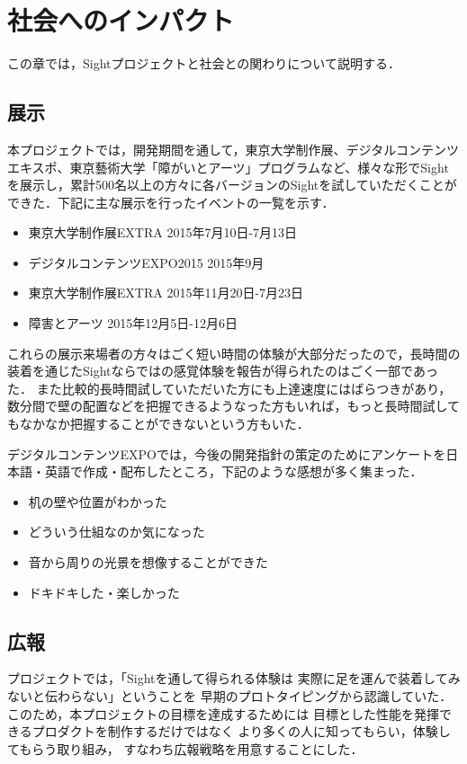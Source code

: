 \section{社会へのインパクト}

この章では，Sightプロジェクトと社会との関わりについて説明する．


\subsection{展示}

本プロジェクトでは，開発期間を通して，東京大学制作展、デジタルコンテンツエキスポ、東京藝術大学「障がいとアーツ」プログラムなど、様々な形でSightを展示し，累計500名以上の方々に各バージョンのSightを試していただくことができた．下記に主な展示を行ったイベントの一覧を示す．

\begin{itemize}
 \item 東京大学制作展EXTRA 2015年7月10日-7月13日
 \item デジタルコンテンツEXPO2015 2015年9月
 \item 東京大学制作展EXTRA 2015年11月20日-7月23日
 \item 障害とアーツ 2015年12月5日-12月6日
\end{itemize}

これらの展示来場者の方々はごく短い時間の体験が大部分だったので，長時間の装着を通じたSightならではの感覚体験を報告が得られたのはごく一部であった．
また比較的長時間試していただいた方にも上達速度にはばらつきがあり，
数分間で壁の配置などを把握できるようなった方もいれば，もっと長時間試してもなかなか把握することができないという方もいた．

デジタルコンテンツEXPOでは，今後の開発指針の策定のためにアンケートを日本語・英語で作成・配布したところ，下記のような感想が多く集まった．

\begin{itemize}
 \item 机の壁や位置がわかった
 \item どういう仕組なのか気になった
 \item 音から周りの光景を想像することができた
 \item ドキドキした・楽しかった
\end{itemize}


\subsection{広報}

プロジェクトでは，「Sightを通して得られる体験は
実際に足を運んで装着してみないと伝わらない」ということを
早期のプロトタイピングから認識していた．
このため，本プロジェクトの目標を達成するためには
目標とした性能を発揮できるプロダクトを制作するだけではなく
より多くの人に知ってもらい，体験してもらう取り組み，
すなわち広報戦略を用意することにした．

